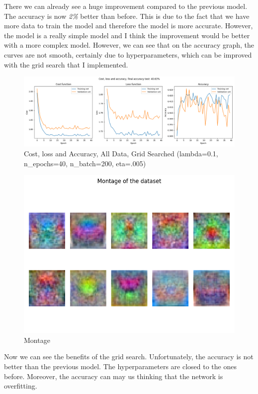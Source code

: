 \documentclass{article}
\begin{document}
There we can already see a huge improvement compared to the previous model. The accuracy is now \textit{2\%} better than before. This is due to the fact that we have more data to train the model and therefore the model is more accurate. However, the model is a really simple model and I think the improvement would be better with a more complex model. However, we can see that on the accuracy graph, the curves are not smooth, certainly due to hyperparameters, which can be improved with the grid search that I implemented.
\begin{figure}[H]
    \centering
    \includegraphics[width=\textwidth]{Result_Pics/cost_loss_accuracy_all_data_grid_searched_0.1_40_200_0.005.png}
    \caption{Cost, loss and Accuracy, All Data, Grid Searched (lambda=0.1, n\_epochs=40, n\_batch=200, eta=.005)}
\end{figure}
\begin{figure}[H]
    \centering
    \includegraphics[scale=0.6]{Result_Pics/weights_all_data_grid_searched_0.1_40_200_0.005.png}
    \caption{Montage}
\end{figure}

Now we can see the benefits of the grid search. Unfortunately, the accuracy is not better than the previous model. The hyperparameters are closed to the ones before. Moreover, the accuracy can may us thinking that the network is overfitting.
\end{document}
